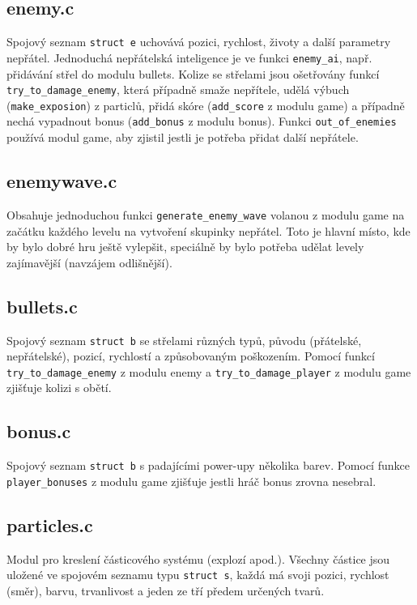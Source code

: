 \documentclass{article}
\begin{document}
\subsection{enemy.c}
Spojový seznam \texttt{struct e} uchovává pozici, rychlost, životy a další
parametry nepřátel. Jednoduchá nepřátelská inteligence je ve funkci
\texttt{enemy\_ai}, např. přidávání střel do modulu bullets. Kolize se
střelami jsou ošetřovány funkcí \texttt{try\_to\_damage\_enemy}, která případně
smaže nepřítele, udělá výbuch (\texttt{make\_exposion}) z particlů, přidá
skóre (\texttt{add\_score} z modulu game) a případně nechá vypadnout bonus
(\texttt{add\_bonus} z modulu bonus). Funkci \texttt{out\_of\_enemies} používá modul
game, aby zjistil jestli je potřeba přidat další nepřátele.

\subsection{enemywave.c}
Obsahuje jednoduchou funkci \texttt{generate\_enemy\_wave} volanou z modulu
game na začátku každého levelu na vytvoření skupinky nepřátel. Toto je
hlavní místo, kde by bylo dobré hru ještě vylepšit, speciálně by bylo
potřeba udělat levely zajímavější (navzájem odlišnější).

\subsection{bullets.c}
Spojový seznam \texttt{struct b} se střelami různých typů, původu (přátelské,
nepřátelské), pozicí, rychlostí a způsobovaným poškozením. Pomocí
funkcí \texttt{try\_to\_damage\_enemy} z modulu enemy a \texttt{try\_to\_damage\_player} z modulu game zjišťuje kolizi s obětí.

\subsection{bonus.c}
Spojový seznam \texttt{struct b} s padajícími power-upy několika barev.
Pomocí funkce \texttt{player\_bonuses} z modulu game zjišťuje jestli hráč
bonus zrovna nesebral.

\subsection{particles.c}
Modul pro kreslení částicového systému (explozí apod.). Všechny
částice jsou uložené ve spojovém seznamu typu \texttt{struct s}, každá má
svoji pozici, rychlost (směr), barvu, trvanlivost a jeden ze tří
předem určených tvarů.
\end{document}
